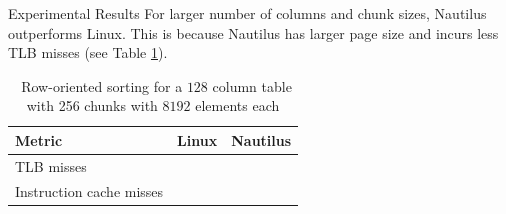 \begin{block}{Experimental Results}
  For larger number of columns and chunk sizes, Nautilus outperforms Linux. This is because Nautilus has larger page size and incurs less TLB misses (see Table \ref{table:cache_miss}).

    \begin{table}
      \bgroup
      \def\arraystretch{1.3}%
      \setlength\tabcolsep{1cm}
      \begin{tabular}{l || r | r }
        \textbf{Metric}  & \textbf{Linux} & \textbf{Nautilus} \\
        \hline\hline
        TLB misses               & \todo{} & \todo{} \\
        Instruction cache misses & \todo{} & \todo{}  \\

      \end{tabular}
\egroup
      \label{table:cache_miss}
      \caption{~Row-oriented sorting for a $128$ column table with 256 chunks with $8192$ elements each}
    \end{table}
  

\end{block}
